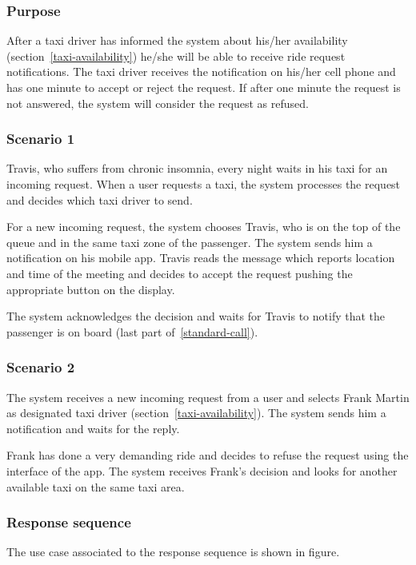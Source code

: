\label{driver-notification}
\subsubsection{Purpose}

After a taxi driver has informed the system about his/her availability (section~\ref{taxi-availability})
he/she will be able to receive ride request notifications. The taxi driver receives the notification on his/her cell phone and has one minute to accept or reject the request. If after one minute the request is not answered, the system will consider the request as refused.

\subsubsection{Scenario 1}
Travis, who suffers from chronic insomnia, every night waits in his taxi for an incoming request. When a user requests a taxi, the system processes the request and decides which taxi driver to send. 

For a new incoming request, the system chooses Travis, who is on the top of the queue and in the same taxi zone of the passenger. The system sends him a notification on his mobile app. Travis reads the message which reports location and time of the meeting and decides to accept the request pushing the appropriate button on the display.

The system acknowledges the decision and waits for Travis to notify that the passenger is on board (last part of~\ref{standard-call}).

\subsubsection{Scenario 2}
The system receives a new incoming request from a user and selects Frank Martin as designated taxi driver (section~\ref{taxi-availability}).
The system sends him a notification and waits for the reply.

Frank has done a very demanding ride and decides to refuse the request using the interface of the app. The system receives Frank's decision and looks for another available taxi on the same taxi area.

\subsubsection{Response sequence}
The use case associated to the response sequence is shown in figure.

